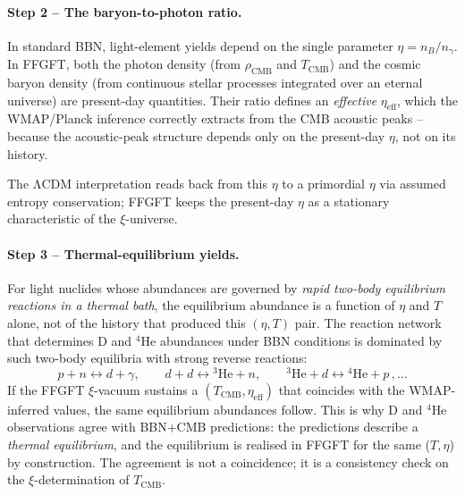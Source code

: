 \documentclass[11pt,a4paper]{article}
\begin{document}
\paragraph{Step 2 -- The baryon-to-photon ratio.}
In standard BBN, light-element yields depend on the single parameter $\eta = n_B/n_\gamma$. In FFGFT, both the photon density (from $\rho_{\mathrm{CMB}}$ and $T_{\mathrm{CMB}}$) and the cosmic baryon density (from continuous stellar processes integrated over an eternal universe) are present-day quantities. Their ratio defines an \emph{effective} $\eta_{\mathrm{eff}}$, which the WMAP/Planck inference correctly extracts from the CMB acoustic peaks -- because the acoustic-peak structure depends only on the present-day $\eta$, not on its history.

The ΛCDM interpretation reads back from this $\eta$ to a primordial $\eta$ via assumed entropy conservation; FFGFT keeps the present-day $\eta$ as a stationary characteristic of the $\xi$-universe.

\paragraph{Step 3 -- Thermal-equilibrium yields.}
For light nuclides whose abundances are governed by \emph{rapid two-body equilibrium reactions in a thermal bath}, the equilibrium abundance is a function of $\eta$ and $T$ alone, not of the history that produced this $(\eta, T)$ pair. The reaction network that determines D and $^4$He abundances under BBN conditions is dominated by such two-body equilibria with strong reverse reactions:
\begin{equation}
p + n \leftrightarrow d + \gamma, \qquad d + d \leftrightarrow {}^3\text{He} + n, \qquad {}^3\text{He} + d \leftrightarrow {}^4\text{He} + p\,, \dots
\end{equation}
If the FFGFT $\xi$-vacuum sustains a $(T_{\mathrm{CMB}}, \eta_{\mathrm{eff}})$ that coincides with the WMAP-inferred values, the same equilibrium abundances follow. This is why D and $^4$He observations agree with BBN+CMB predictions: the predictions describe a \emph{thermal equilibrium}, and the equilibrium is realised in FFGFT for the same ($T, \eta$) by construction. The agreement is not a coincidence; it is a consistency check on the $\xi$-determination of $T_{\mathrm{CMB}}$.
\end{document}
